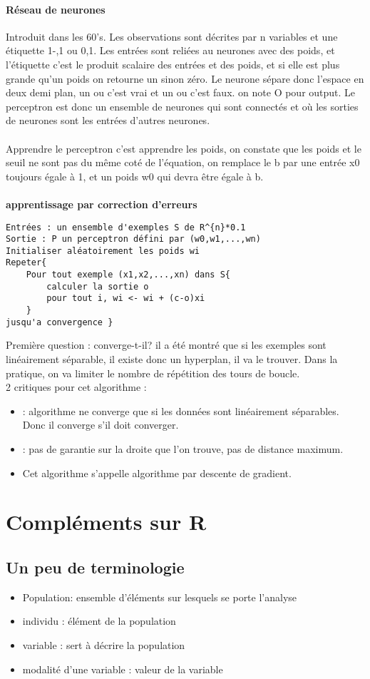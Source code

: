 \documentclass{article}
\begin{document}
\paragraph{Réseau de neurones} Introduit dans les 60's. Les observations sont décrites par n variables et une étiquette 1-,1 ou 0,1. Les entrées sont reliées au neurones avec des poids, et l'étiquette c'est le produit scalaire des entrées et des poids, et si elle est plus grande qu'un poids on retourne un sinon zéro. Le neurone sépare donc l'espace en deux demi plan, un ou c'est vrai et un ou c'est faux. on note O pour output. Le perceptron est donc un ensemble de neurones qui sont connectés et où les sorties de neurones sont les entrées d'autres neurones.\\\\Apprendre le perceptron c'est apprendre les poids, on constate que les poids et le seuil ne sont pas du même coté de l'équation, on remplace le b par une entrée x0 toujours égale à 1, et un poids w0 qui devra être égale à b.\\\\\textbf{apprentissage par correction d'erreurs} \begin{verbatim}
Entrées : un ensemble d'exemples S de R^{n}*0.1
Sortie : P un perceptron défini par (w0,w1,...,wn)
Initialiser aléatoirement les poids wi
Repeter{
	Pour tout exemple (x1,x2,...,xn) dans S{
		calculer la sortie o
		pour tout i, wi <- wi + (c-o)xi
	}
jusqu'a convergence }
\end{verbatim}
Première question : converge-t-il? il a été montré que si les exemples sont linéairement séparable, il existe donc un hyperplan, il va le trouver. Dans la pratique, on va limiter le nombre de répétition des tours de boucle.\\ 2 critiques pour cet algorithme : \begin{itemize}
\item : algorithme ne converge que si les données sont linéairement séparables. Donc il converge s'il doit converger.
\item : pas de garantie sur la droite que l'on trouve, pas de distance maximum.
\item Cet algorithme s'appelle algorithme par descente de gradient. 
\end{itemize}

\section{Compléments sur R}
\subsection{Un peu de terminologie}
\begin{itemize}
\item Population: ensemble d'éléments sur lesquels se porte l'analyse
\item individu : élément de la population
\item variable : sert à décrire la population
\item modalité d'une variable : valeur de la variable
\end{itemize}
\end{document}
